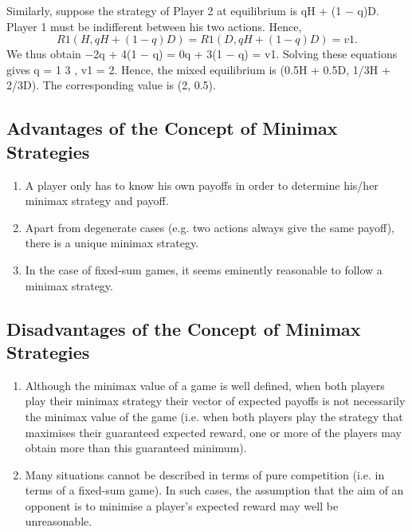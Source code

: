 \documentclass[]{report}
\begin{document}
	Similarly, suppose the strategy of Player 2 at equilibrium is
	qH + (1 − q)D. Player 1 must be indifferent between his two
	actions. Hence,
	\[R1(H, qH + (1 − q)D) = R1(D, qH + (1 − q)D) = v1.\]
	We thus obtain −2q + 4(1 − q) = 0q + 3(1 − q) = v1. Solving
	these equations gives q =
	1
	3
	, v1 = 2.
	Hence, the mixed equilibrium is (0.5H + 0.5D, 1/3H + 2/3D). The
	corresponding value is (2, 0.5).
	\subsection{Advantages of the Concept of Minimax Strategies}
	\begin{enumerate}
		\item  A player only has to know his own payoffs in order to
		determine his/her minimax strategy and payoff.
		\item  Apart from degenerate cases (e.g. two actions always
		give the same payoff), there is a unique minimax
		strategy.
		\item  In the case of fixed-sum games, it seems eminently
		reasonable to follow a minimax strategy.
	\end{enumerate}
	
	\subsection{Disadvantages of the Concept of Minimax Strategies}
	\begin{enumerate}
		\item  Although the minimax value of a game is well
		defined, when both players play their minimax
		strategy their vector of expected payoffs is not
		necessarily the minimax value of the game (i.e. when
		both players play the strategy that maximises their
		guaranteed expected reward, one or more of the
		players may obtain more than this guaranteed
		minimum).
		\item Many situations cannot be described in terms of pure
		competition (i.e. in terms of a fixed-sum game). In
		such cases, the assumption that the aim of an
		opponent is to minimise a player’s expected reward
		may well be unreasonable.
	\end{enumerate}
	
\end{document}
